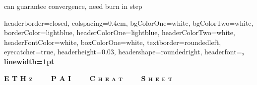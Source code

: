 \documentclass[landscape,a0paper,fontscale=0.285]{baposter} %
\begin{document}
\begin{poster}
{can guarantee convergence, need burn in step




}






\end{poster}




\newpage



\begin{poster}
{
headerborder=closed, %
colspacing=0.4em, %
bgColorOne=white, %
bgColorTwo=white, %
borderColor=lightblue, %
headerColorOne=lightblue, %
headerColorTwo=white, %
headerFontColor=white, %
boxColorOne=white, %
textborder=roundedleft, %
eyecatcher=true, %
headerheight=0.03\textheight, %
headershape=roundedright, %
headerfont=\Large\bf\textsc, %
linewidth=1pt %
}

{\bf\textsc{E T H z \ \ \ \ P A I \ \ \ \ C h e a t \ \ \ \ S h e e t}\vspace{0.0em}} %



\end{poster}
\end{document}
